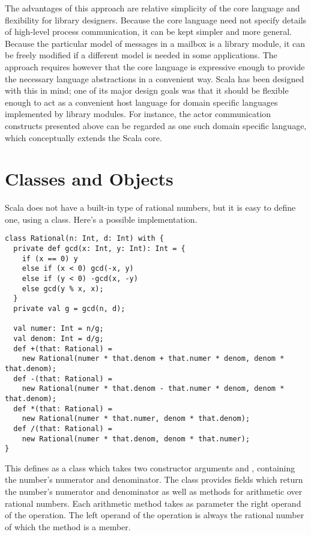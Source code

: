 \documentclass[11pt]{report}
\begin{document}
The advantages of this approach are relative simplicity of the core
language and flexibility for library designers. Because the core
language need not specify details of high-level process communication,
it can be kept simpler and more general. Because the particular model
of messages in a mailbox is a library module, it can be freely
modified if a different model is needed in some applications.  The
approach requires however that the core language is expressive enough
to provide the necessary language abstractions in a convenient
way. Scala has been designed with this in mind; one of its major
design goals was that it should be flexible enough to act as a
convenient host language for domain specific languages implemented by
library modules. For instance, the actor communication constructs
presented above can be regarded as one such domain specific language,
which conceptually extends the Scala core.

\chapter{Classes and Objects}
\label{chap:classes}

Scala does not have a built-in type of rational numbers, but it is
easy to define one, using a class. Here's a possible
implementation.

\begin{verbatim}
class Rational(n: Int, d: Int) with {
  private def gcd(x: Int, y: Int): Int = {
    if (x == 0) y
    else if (x < 0) gcd(-x, y)
    else if (y < 0) -gcd(x, -y)
    else gcd(y % x, x);
  }
  private val g = gcd(n, d);

  val numer: Int = n/g;
  val denom: Int = d/g;
  def +(that: Rational) =
    new Rational(numer * that.denom + that.numer * denom, denom * that.denom);
  def -(that: Rational) =
    new Rational(numer * that.denom - that.numer * denom, denom * that.denom);
  def *(that: Rational) =
    new Rational(numer * that.numer, denom * that.denom);
  def /(that: Rational) =
    new Rational(numer * that.denom, denom * that.numer);
}
\end{verbatim}
This defines \verb@Rational@ as a class which takes two constructor arguments
\verb@n@ and \verb@d@, containing the number's numerator and denominator.
The class provides fields which return the number's numerator and
denominator as well as methods for arithmetic over rational numbers.
Each arithmetic method takes as parameter the right operand of the
operation. The left operand of the operation is always the rational
number of which the method is a member.
\end{document}
